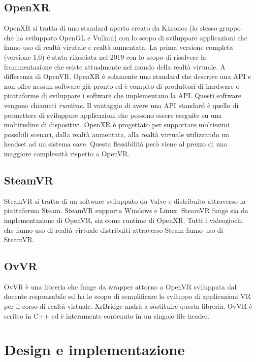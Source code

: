 \documentclass[twoside]{supsistudent}
\begin{document}
\section{OpenXR}

OpenXR si tratta di uno standard aperto creato da Khronos (lo stesso gruppo che ha sviluppato OpenGL e Vulkan) con lo scopo di sviluppare applicazioni che fanno uso di realtà virutale e realtà aumentata. La prima versione completa (versione 1.0) è stata rilasciata nel 2019 con lo scopo di risolvere la frammentazione che esiste attualmente nel mondo della realtà virtuale. A differenza di OpenVR, OpenXR è solamente uno standard che descrive una API e non offre nessun software già pronto ed è compito di produttori di hardware o piattaforme di sviluppare i software che implementano la API. Questi software vengono chiamati \textit{runtime}. Il vantaggio di avere una API standard è quello di permettere di sviluppare applicazioni che possono essere eseguite su una moltitudine di dispositivi. OpenXR è progettato per supportare moltissimi possibili scenari, dalla realtà aumentata, alla realtà virtuale utilizzando un headset ad un sistema cave. Questa flessibilità però viene al prezzo di una maggiore complessità rispetto a OpenVR.

\section{SteamVR}

SteamVR si tratta di un software sviluppato da Valve e distribuito attraverso la piattaforma Steam. SteamVR supporta Windows e Linux. SteamVR funge sia da implementazione di OpenVR, sia come runtime di OpenXR. Tutti i videogiochi che fanno uso di realtà virtuale distribuiti attraverso Steam fanno uso di SteamVR.

\section{OvVR}

OvVR è una libreria che funge da wrapper attorno a OpenVR sviluppata dal docente responsabile ed ha lo scopo di semplificare lo sviluppo di applicazioni VR per il corso di realtà virtuale. XrBridge andrà a sostituire questa libreria. OvVR è scritto in C++ ed è interamente contenuto in un singolo file header.

\chapter{Design e implementazione}
\end{document}
